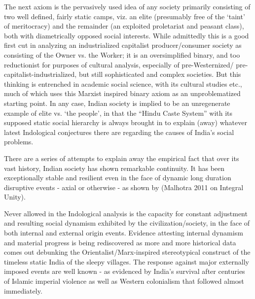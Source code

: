 The next axiom is the pervasively used idea of any society primarily consisting of two well defined, fairly static camps, viz. an elite (presumably free of the ‘taint’ of meritocracy) and the remainder (an exploited proletariat and peasant class), both with diametrically opposed social interests. While admittedly this is a good first cut in analyzing an industrialized capitalist producer/consumer society as consisting of the Owner vs. the Worker; it is an oversimplified binary, and too reductionist for purposes of cultural analysis, especially of pre-Westernized/ pre-capitalist-industrialized, but still sophisticated and complex societies. But this thinking is entrenched in academic social science, with its cultural studies etc., much of which uses this Marxist inspired binary axiom as an unproblematized starting point. In any case, Indian society is implied to be an unregenerate example of elite vs. ‘the people’, in that the “Hindu Caste System” with its supposed static social hierarchy is always brought in to explain (away) whatever latest Indological conjectures there are regarding the causes of India’s social problems.

There are a series of attempts to explain away the empirical fact that over its vast history, Indian society has shown remarkable continuity. It has been exceptionally stable and resilient even in the face of dynamic long duration disruptive events - axial or otherwise - as shown by (Malhotra 2011 on Integral Unity). 

Never allowed in the Indological analysis is the capacity for constant adjustment and resulting social dynamism exhibited by the civilization/society, in the face of both internal and external origin events. Evidence attesting internal dynamism and material progress is being rediscovered as more and more historical data comes out debunking the Orientalist/Marx-inspired stereotypical construct of the timeless static India of the sleepy villages. The response against major externally imposed events are well known - as evidenced by India’s survival after centuries of Islamic imperial violence as well as Western colonialism that followed almost immediately.



